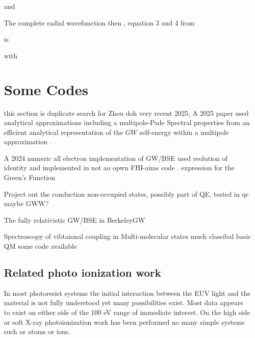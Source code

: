 and 




The complete radial wavefunction then , equation 3 and 4 from
\cite{Sakuma_Aryasetiawan_Self_energy_calculation_2012}

is 

with


\section{ Some Codes}
this section is duplicate search for Zhou doh 
very recent 2025, 
A 2025 paper used analytical approximations including a multipole-Pade 
Spectral properties from an efficient analytical representation of 
the $GW$ self-energy within a multipole approximation
 \cite{2025arXiv250109121L}.

A 2024 numeric all electron implementation of GW/BSE used reolution of identity
and implemented in not ao opwn FHI-aims code 
\cite{Zhou_Yao_Blum_electron_2024}.
expression for the Green's Function

Project out the conduction non-occupied states, 
possibly part of QE, tested in qe
maybe GWW? \cite{Rocca_Lu_Galli_initio_calculations_2010}

The fully relativistic GW/BSE in BerkeleyGW
\cite{Barker_Deslippe_Lischner_Spinor_math_xmlns_2022}

Spectroscopy of vibtaional coupling in Multi-molecular states
much classibal basic QM some code available
\cite{Hammer_Linderl_Tvingstedt_Spectroscopic_analysis_vibrational_2023}



\subsection{Related photo ionization work }
In most photoresist systems the initial interaction between the
EUV light and the material is not fully understood yet many
possibilities exist. 
Most data appears to exist on either side of the 100 eV range
of immediate interest. On the high side or soft X-ray photoionization
work has been performed no many simple systems such as atoms or ions.

